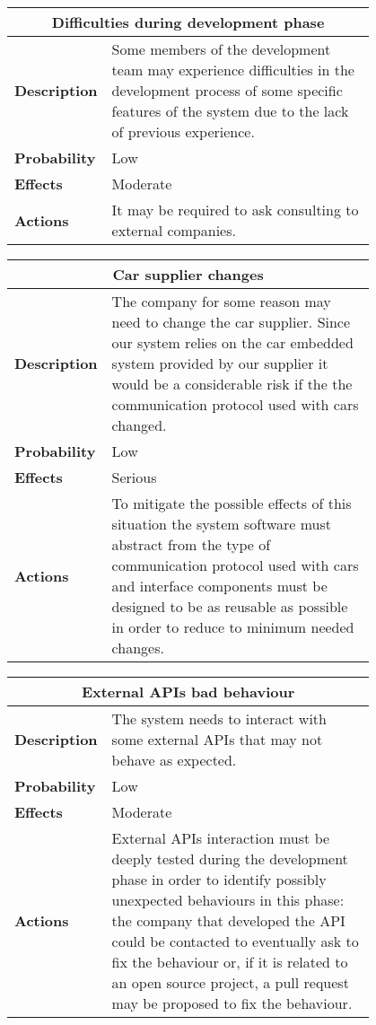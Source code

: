 \begin{longtable}{lp{0.8\linewidth}}
\multicolumn{2}{c}{\textbf{Difficulties during development phase}}\\
\toprule
\textbf{Description}& Some members of the development team may experience difficulties in the development process of some specific features of the system due to the lack of previous experience. \\
\midrule
\textbf{Probability}&Low\\
\midrule
\textbf{Effects}&Moderate\\
\midrule
\textbf{Actions}& It may be required to ask consulting to external companies.\\
\bottomrule
\end{longtable}

\begin{longtable}{lp{0.8\linewidth}}
\multicolumn{2}{c}{\textbf{Car supplier changes}}\\
\toprule
\textbf{Description}& The company for some reason may need to change the car supplier. Since our system relies on the car embedded system provided by our supplier it would be a considerable risk if the the communication protocol used with cars changed. \\
\midrule
\textbf{Probability}&Low\\
\midrule
\textbf{Effects}&Serious\\
\midrule
\textbf{Actions}& To mitigate the possible effects of this situation the system software must abstract from the type of communication protocol used with cars and interface components must be designed to be as reusable as possible in order to reduce to minimum needed changes.\\
\bottomrule
\end{longtable}

\begin{longtable}{lp{0.8\linewidth}}
\multicolumn{2}{c}{\textbf{External APIs bad behaviour}}\\
\toprule
\textbf{Description}& The system needs to interact with some external APIs that may not behave as expected. \\
\midrule
\textbf{Probability}&Low\\
\midrule
\textbf{Effects}&Moderate\\
\midrule
\textbf{Actions}& External APIs interaction must be deeply tested during the development phase in order to identify possibly unexpected behaviours in this phase: the company that developed the API could be contacted to eventually ask to fix the behaviour or, if it is related to an open source project, a pull request may be proposed to fix the behaviour. \\
\bottomrule
\end{longtable}


